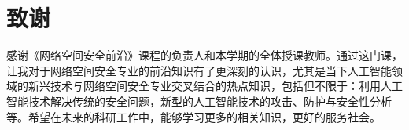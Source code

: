 \documentclass[lettersize,journal]{IEEEtran}
\begin{document}
\section{致谢}
感谢《网络空间安全前沿》课程的负责人和本学期的全体授课教师。通过这门课，让我对于网络空间安全专业的前沿知识有了更深刻的认识，尤其是当下人工智能领域的新兴技术与网络空间安全专业交叉结合的热点知识，包括但不限于：利用人工智能技术解决传统的安全问题，新型的人工智能技术的攻击、防护与安全性分析等。希望在未来的科研工作中，能够学习更多的相关知识，更好的服务社会。







%
%

\vspace{11pt}

\vfill
\end{document}
